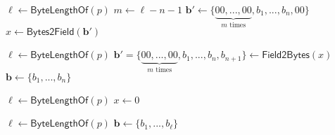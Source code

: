 \begin{algorithm}[ht]
\DontPrintSemicolon
    \caption{\( \mathsf{Bytes2Point} (\boldsymbol{b}) \)}
    \label{alg: bytes to point}
    \( \ell \gets \mathsf{ByteLengthOf}(p) \) \;
    \( m \gets \ell - n - 1\) \;
    \( \boldsymbol{b}' \gets \{ \underbrace{00, ..., 00}_\text{$m$ times}, b_1, ..., b_n, 00 \} \) \;
    \( x \gets \mathsf{Bytes2Field}(\boldsymbol{b}') \) \;
\end{algorithm}

\begin{algorithm}[ht]
\DontPrintSemicolon
    \caption{\( \mathsf{Point2Bytes} (M) \)}
    \label{alg: point to bytes}
    \( \ell \gets \mathsf{ByteLengthOf}(p) \) \;
    \( \boldsymbol{b}' = \{ \underbrace{00, ..., 00}_\text{$m$ times}, b_1, ..., b_n, b_{n+1} \} \gets \mathsf{Field2Bytes}(x) \) 
    \( \boldsymbol{b} \gets \{ b_1, ..., b_n \} \) \;
    
     
\end{algorithm}

\begin{algorithm}[ht]
\DontPrintSemicolon
    \caption{\( \mathsf{Bytes2Field} (\boldsymbol{b}) \)}
    \label{alg: bytes to field}
    \( \ell \gets \mathsf{ByteLengthOf}(p) \) \;
    \( x \gets 0 \) \;
     
\end{algorithm}

\begin{algorithm}[ht]
\DontPrintSemicolon
    \caption{\( \mathsf{Field2Bytes} (x) \)}
    \label{alg: field to bytes}
    \( \ell \gets \mathsf{ByteLengthOf}(p) \) \;
    \( \boldsymbol{b} \gets \{ b_1, ..., b_\ell \} \) \;
    
     
\end{algorithm}

